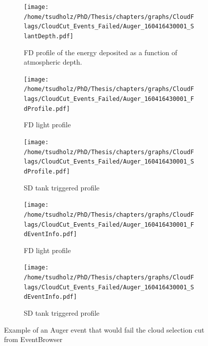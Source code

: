 \begin{figure}[!p]
\centering
 \vspace{2cm}
  \begin{subfigure}[b]{\textwidth}
  \centering
  \texttt{[image: /home/tsudholz/PhD/Thesis/chapters/graphs/CloudFlags/CloudCut\_Events\_Failed/Auger\_160416430001\_SlantDepth.pdf]}
  \caption{FD profile of the energy deposited as a function of atmospheric depth.}
  \end{subfigure}
 \vspace{0.5cm}
  \begin{subfigure}[b]{0.45\textwidth}
  	\centering
  	\texttt{[image: /home/tsudholz/PhD/Thesis/chapters/graphs/CloudFlags/CloudCut\_Events\_Failed/Auger\_160416430001\_FdProfile.pdf]}
  	\caption{FD light profile}
  \end{subfigure}
  \begin{subfigure}[b]{0.45\textwidth}
  	\centering
  	\texttt{[image: /home/tsudholz/PhD/Thesis/chapters/graphs/CloudFlags/CloudCut\_Events\_Failed/Auger\_160416430001\_SdProfile.pdf]}
  	\caption{SD tank triggered profile}
  \end{subfigure}

  \begin{subfigure}[b]{0.45\textwidth}
  	\centering
	\texttt{[image: /home/tsudholz/PhD/Thesis/chapters/graphs/CloudFlags/CloudCut\_Events\_Failed/Auger\_160416430001\_FdEventInfo.pdf]}
  	\caption{FD light profile}
  \end{subfigure}
  \begin{subfigure}[b]{0.45\textwidth}
  	\centering
	\texttt{[image: /home/tsudholz/PhD/Thesis/chapters/graphs/CloudFlags/CloudCut\_Events\_Failed/Auger\_160416430001\_SdEventInfo.pdf]}
  	\caption{SD tank triggered profile}
  \end{subfigure}
  \caption{Example of an Auger event that would fail the cloud selection cut from EventBrowser}
\end{figure}

